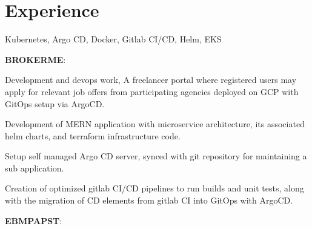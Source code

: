 \documentclass[]{font}
\begin{document}
\begin{minipage}[t]{0.66\textwidth} 


\section{Experience}


Kubernetes, Argo CD, Docker, Gitlab CI/CD, Helm, EKS
\vspace{\topsep}

\textbf{BROKERME}:
\vspace{\topsep}

\begin{tightemize}
\item Development and devops work, A freelancer portal where registered users may apply for relevant job offers from participating agencies deployed on GCP with GitOps setup via ArgoCD.
\item Development of MERN application with microservice architecture, its associated helm charts, and terraform infrastructure code.
\item Setup self managed Argo CD server, synced with git repository for maintaining a sub application.
\item Creation of optimized gitlab CI/CD pipelines to run builds and unit tests, along with the migration of CD elements from gitlab CI into GitOps with ArgoCD.
\end{tightemize}

\vspace{\topsep}
\textbf{EBMPAPST}:


\end{minipage}
\end{document}
